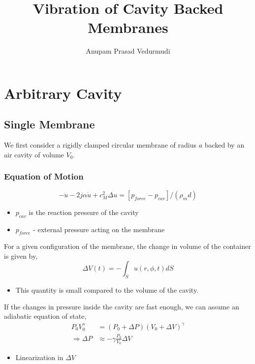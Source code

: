 \documentclass{beamer}
\title{Vibration of Cavity Backed Membranes}
\author{Anupam Prasad Vedurmudi}
\begin{document}
\begin{frame}
 \titlepage
\end{frame}

\section{Arbitrary Cavity}
\subsection{Single Membrane}
\begin{frame}
 We first consider a rigidly clamped circular membrane of radius $a$ backed by an air cavity
 of volume $V_0$.


\end{frame}

\begin{frame}
 \frametitle{Equation of Motion}
  \begin{equation}\label{membraneeom1}
   -\ddot{u}-2j\alpha\dot{u}+c^2_M\Delta u=\left[p_{force}-p_{cav}\right]/(\rho_m d)
  \end{equation}
\begin{itemize}
 \item $p_{cav}$ is the reaction pressure of the cavity
 \item $p_{force}$ - external pressure acting on the membrane
\end{itemize}

\end{frame}

\begin{frame}
 For a given configuration of the membrane, the change in volume of the container
 is given by,
 \begin{equation}\label{volchange1}
  \Delta V(t)=-\int_Su(r,\phi,t)dS
 \end{equation}
 \begin{itemize}
  \item This quantity is small compared to the volume of the cavity.
 \end{itemize}
\end{frame}

\begin{frame}
 If the changes in pressure inside the cavity are fast enough, we can assume an
 adiabatic equation of state,
 \begin{align}
  P_0V^\gamma_0&=(P_0+\Delta P)(V_0+\Delta V)^\gamma\\
  \Rightarrow \Delta P&\approx-\gamma\frac{P_0}{V_0}\Delta V
 \end{align}
 \begin{itemize}
  \item Linearization in $\Delta V$
 \end{itemize}
\end{frame}
\end{document}
